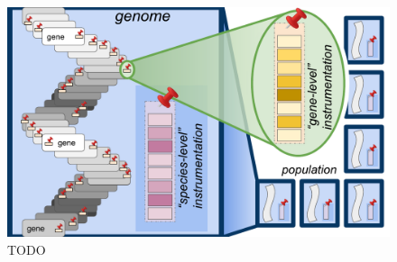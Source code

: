 \begin{figure}
  \centering
  \includegraphics[width=\textwidth]{img/annotation-types}
  \caption{
    TODO
  }
  \label{fig:annotation-types}
\end{figure}
